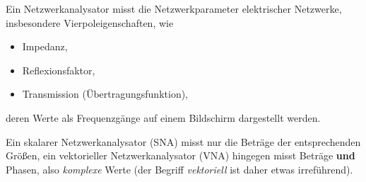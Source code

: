 Ein Netzwerkanalysator misst die Netzwerkparameter elektrischer Netzwerke,
insbesondere Vierpoleigenschaften, wie
\begin{itemize}
  \item Impedanz,
  \item Reflexionsfaktor,
  \item Transmission (Übertragungsfunktion),
\end{itemize}
deren Werte als Frequenzgänge auf einem Bildschirm dargestellt werden.

Ein skalarer Netzwerkanalysator (SNA) misst nur die Beträge der entsprechenden
Größen, ein vektorieller Netzwerkanalysator (VNA)
hingegen misst Beträge \textbf{und} Phasen, also \emph{komplexe} Werte (der Begriff
\emph{vektoriell} ist daher etwas irreführend).
